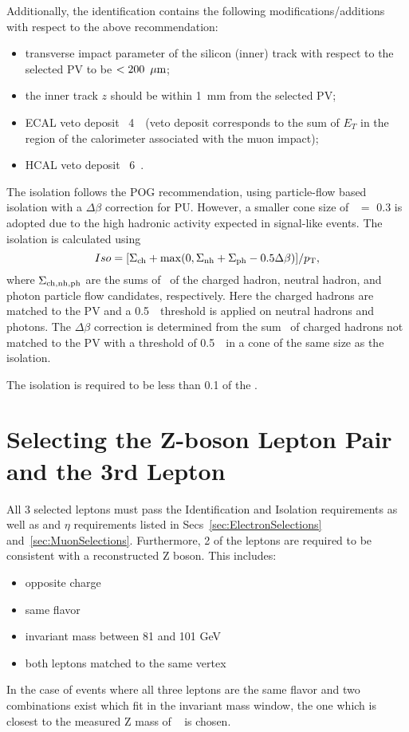 Additionally, the identification contains the following modifications/additions with respect to the above recommendation:

\begin{itemize}
\item transverse impact parameter of the silicon (inner) track with respect to the selected PV to be $<200~\,\mu\text{m}$;
\item the inner track $z$ should be within 1~mm from the selected PV;
\item ECAL veto deposit \lt\ 4~\GeV\ (veto deposit corresponds to the sum of $E_T$ in the region of the calorimeter
associated with the muon impact);
\item HCAL veto deposit \lt\ 6~\GeV.
\end{itemize}

The isolation follows the POG recommendation, using particle-flow based isolation with a $\Delta\beta$ correction for PU.  
However, a smaller cone size of \DR\ $=$ 0.3 is adopted due to the high hadronic activity expected in signal-like events.  
The isolation is calculated using 
$$
Iso = [ \Sigma_{\rm ch} + {\rm max}(0, \Sigma_{\rm nh} + \Sigma_{\rm ph} - 0.5 \Delta\beta) ]/p_{\mathrm{T}},
$$
where $\Sigma_{\rm ch, nh, ph}$ are the sums of \pt\ of the charged hadron, neutral hadron, and photon particle flow candidates, respectively.
Here the charged hadrons are matched to the PV and a 0.5~\GeV\ threshold is applied on neutral hadrons and photons.  
The $\Delta\beta$ correction is determined from the sum \pt\ of charged hadrons not matched to the PV with a threshold of 0.5~\GeV\ in a cone of the same size as the isolation.  
 
The isolation is required to be less than 0.1 of the \pt.


\section{Selecting the Z-boson Lepton Pair and the 3rd Lepton}
\label{sec:3LepSelection}
All 3 selected leptons must pass the Identification and Isolation requirements as well as \pt and $\eta$ requirements listed in Secs~\ref{sec:ElectronSelections} and~\ref{sec:MuonSelections}. Furthermore, 2 of the leptons are required to be consistent with a reconstructed Z boson. This includes:
\begin{itemize}
\item opposite charge
\item same flavor
\item invariant mass between 81 and 101 GeV
\item both leptons matched to the same vertex
\end{itemize}
In the case of events where all three leptons are the same flavor and two combinations exist which fit in the invariant mass window, the one which is closest to the measured Z mass of \zmass ~\cite{pdg} is chosen.\\

